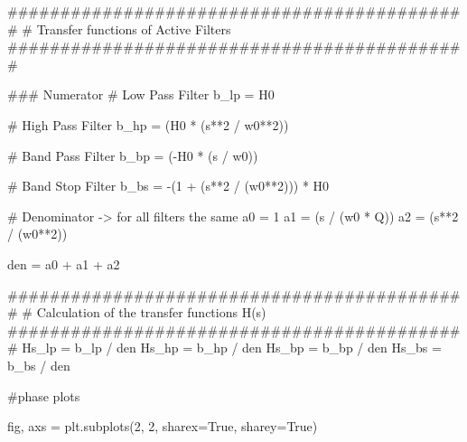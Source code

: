 \documentclass[
  letterpaper,
]{scrbook}
\newenvironment{Shaded}{}{}
\newcommand{\CommentTok}[1]{\textcolor[rgb]{0.42,0.45,0.49}{#1}}
\newcommand{\DecValTok}[1]{\textcolor[rgb]{0.00,0.36,0.77}{#1}}
\newcommand{\NormalTok}[1]{\textcolor[rgb]{0.14,0.16,0.18}{#1}}
\newcommand{\OperatorTok}[1]{\textcolor[rgb]{0.14,0.16,0.18}{#1}}
\newcommand{\VariableTok}[1]{\textcolor[rgb]{0.89,0.38,0.04}{#1}}
\begin{document}
\begin{codelisting}
{\begin{Shaded}
\begin{Highlighting}[]
\CommentTok{\#\#\#\#\#\#\#\#\#\#\#\#\#\#\#\#\#\#\#\#\#\#\#\#\#\#\#\#\#\#\#\#\#\#\#\#\#\#\#\#\#\#\#\#}
\CommentTok{\# Transfer functions of Active Filters}
\CommentTok{\#\#\#\#\#\#\#\#\#\#\#\#\#\#\#\#\#\#\#\#\#\#\#\#\#\#\#\#\#\#\#\#\#\#\#\#\#\#\#\#\#\#\#\#}


\CommentTok{\#\#\# Numerator}
\CommentTok{\# Low Pass Filter}
\NormalTok{b\_lp }\OperatorTok{=}\NormalTok{ H0}

\CommentTok{\# High Pass Filter}
\NormalTok{b\_hp }\OperatorTok{=}\NormalTok{ (H0 }\OperatorTok{*}\NormalTok{ (s}\OperatorTok{**}\DecValTok{2} \OperatorTok{/}\NormalTok{ w0}\OperatorTok{**}\DecValTok{2}\NormalTok{))}

\CommentTok{\# Band Pass Filter}
\NormalTok{b\_bp }\OperatorTok{=}\NormalTok{ (}\OperatorTok{{-}}\NormalTok{H0 }\OperatorTok{*}\NormalTok{ (s }\OperatorTok{/}\NormalTok{ w0))}

\CommentTok{\# Band Stop Filter}
\NormalTok{b\_bs }\OperatorTok{=} \OperatorTok{{-}}\NormalTok{(}\DecValTok{1} \OperatorTok{+}\NormalTok{ (s}\OperatorTok{**}\DecValTok{2} \OperatorTok{/}\NormalTok{ (w0}\OperatorTok{**}\DecValTok{2}\NormalTok{))) }\OperatorTok{*}\NormalTok{ H0}

\CommentTok{\# Denominator {-}\textgreater{} for all filters the same}
\NormalTok{a0 }\OperatorTok{=} \DecValTok{1}
\NormalTok{a1 }\OperatorTok{=}\NormalTok{ (s }\OperatorTok{/}\NormalTok{ (w0 }\OperatorTok{*}\NormalTok{ Q))}
\NormalTok{a2 }\OperatorTok{=}\NormalTok{ (s}\OperatorTok{**}\DecValTok{2} \OperatorTok{/}\NormalTok{ (w0}\OperatorTok{**}\DecValTok{2}\NormalTok{))}

\NormalTok{den }\OperatorTok{=}\NormalTok{ a0 }\OperatorTok{+}\NormalTok{ a1 }\OperatorTok{+}\NormalTok{ a2}

\CommentTok{\#\#\#\#\#\#\#\#\#\#\#\#\#\#\#\#\#\#\#\#\#\#\#\#\#\#\#\#\#\#\#\#\#\#\#\#\#\#\#\#\#\#\#\#}
\CommentTok{\# Calculation of the transfer functions H(s)}
\CommentTok{\#\#\#\#\#\#\#\#\#\#\#\#\#\#\#\#\#\#\#\#\#\#\#\#\#\#\#\#\#\#\#\#\#\#\#\#\#\#\#\#\#\#\#\#}
\NormalTok{Hs\_lp }\OperatorTok{=}\NormalTok{ b\_lp }\OperatorTok{/}\NormalTok{ den}
\NormalTok{Hs\_hp }\OperatorTok{=}\NormalTok{ b\_hp }\OperatorTok{/}\NormalTok{ den}
\NormalTok{Hs\_bp }\OperatorTok{=}\NormalTok{ b\_bp }\OperatorTok{/}\NormalTok{ den}
\NormalTok{Hs\_bs }\OperatorTok{=}\NormalTok{ b\_bs }\OperatorTok{/}\NormalTok{ den}

\CommentTok{\#phase plots}

\NormalTok{fig, axs }\OperatorTok{=}\NormalTok{ plt.subplots(}\DecValTok{2}\NormalTok{, }\DecValTok{2}\NormalTok{, sharex}\OperatorTok{=}\VariableTok{True}\NormalTok{, sharey}\OperatorTok{=}\VariableTok{True}\NormalTok{)}


\end{Highlighting}
\end{Shaded}}
\end{codelisting}
\end{document}
